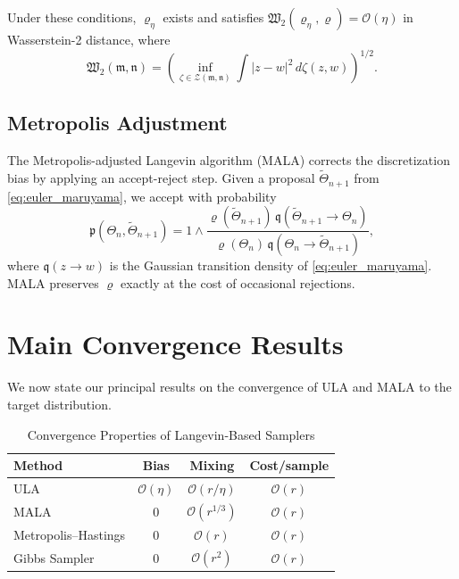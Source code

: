 \documentclass[journal]{IEEEtran}
\begin{document}
Under these conditions, $\varrho_\eta$ exists and satisfies $\mathfrak{W}_2(\varrho_\eta, \varrho) = \mathcal{O}(\eta)$ in Wasserstein-2 distance, where
\begin{equation}\label{eq:wasserstein}
  \mathfrak{W}_2(\mathfrak{m}, \mathfrak{n}) = \left(\inf_{\zeta \in \mathcal{Z}(\mathfrak{m},\mathfrak{n})} \int |z - w|^2\, d\zeta(z,w)\right)^{1/2}.
\end{equation}

\subsection{Metropolis Adjustment}

The Metropolis-adjusted Langevin algorithm (MALA) corrects the discretization bias by applying an accept-reject step. Given a proposal $\widetilde{\Theta}_{n+1}$ from \eqref{eq:euler_maruyama}, we accept with probability
\begin{equation}\label{eq:mala}
  \mathfrak{p}(\Theta_n, \widetilde{\Theta}_{n+1}) = 1 \wedge \frac{\varrho(\widetilde{\Theta}_{n+1})\, \mathfrak{q}(\widetilde{\Theta}_{n+1} \to \Theta_n)}{\varrho(\Theta_n)\, \mathfrak{q}(\Theta_n \to \widetilde{\Theta}_{n+1})},
\end{equation}
where $\mathfrak{q}(z \to w)$ is the Gaussian transition density of \eqref{eq:euler_maruyama}. MALA preserves $\varrho$ exactly at the cost of occasional rejections.

\section{Main Convergence Results}
\label{sec:convergence}

We now state our principal results on the convergence of ULA and MALA to the target distribution.

\begin{table}[t]
\centering
\caption{Convergence Properties of Langevin-Based Samplers}
\label{tab:comparison}
\begin{tabular}{@{}lccc@{}}
\toprule
\textbf{Method} & \textbf{Bias} & \textbf{Mixing} & \textbf{Cost/sample} \\
\midrule
ULA              & $\mathcal{O}(\eta)$          & $\mathcal{O}(r/\eta)$  & $\mathcal{O}(r)$   \\
MALA             & $0$                           & $\mathcal{O}(r^{1/3})$ & $\mathcal{O}(r)$ \\
Metropolis--Hastings & $0$                       & $\mathcal{O}(r)$       & $\mathcal{O}(r)$   \\
Gibbs Sampler    & $0$                           & $\mathcal{O}(r^2)$     & $\mathcal{O}(r)$   \\
\bottomrule
\end{tabular}
\end{table}
\end{document}

